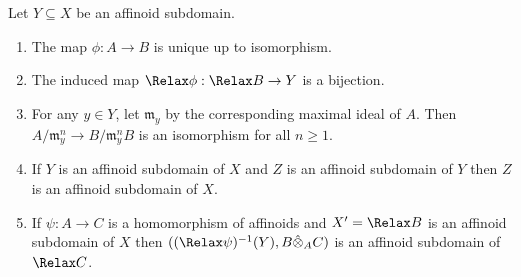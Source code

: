 \documentclass[a4paper]{article}
\let\Sp\Relax
\DeclareMathOperator{\Sp}{Sp} %
\begin{document}
\begin{proposition}
  Let \(Y \subseteq X\) be an affinoid subdomain.
  \begin{enumerate}
  \item The map \(\phi: A \to B\) is unique up to isomorphism.
  \item The induced map \(\Sp \phi: \Sp B \to Y\) is a bijection.
  \item For any \(y \in Y\), let \(\mathfrak m_y\) by the corresponding maximal ideal of \(A\). Then \(A/\mathfrak m_y^n \to B/\mathfrak m_y^nB\) is an isomorphism for all \(n \geq 1\).
  \item If \(Y\) is an affinoid subdomain of \(X\) and \(Z\) is an affinoid subdomain of \(Y\) then \(Z\) is an affinoid subdomain of \(X\).
  \item If \(\psi: A \to C\) is a homomorphism of affinoids and \(X' = \Sp B\) is an affinoid subdomain of \(X\) then \(((\Sp\psi)^{-1}(Y), B \hat \otimes_A C)\) is an affinoid subdomain of \(\Sp C\).
  \end{enumerate}
\end{proposition}
\end{document}
